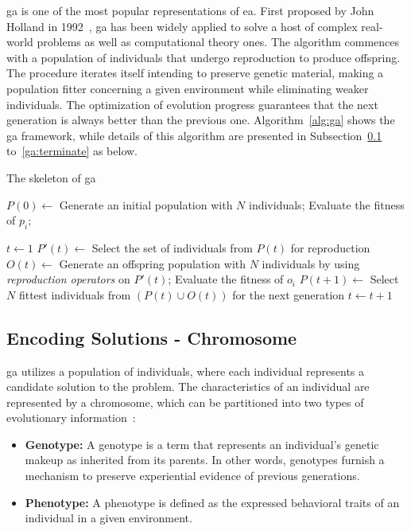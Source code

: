 \acrfull{ga} is one of the most popular representations of \gls{ea}. First proposed by John Holland in 1992~\cite{holland1992genetic}, \gls{ga} has been widely applied to solve a host of complex real-world problems as well as computational theory ones. The algorithm commences with a population of individuals that undergo reproduction to produce offspring. The procedure iterates itself intending to preserve genetic material, making a population fitter concerning a given environment while eliminating weaker individuals. The optimization of evolution progress guarantees that the next generation is always better than the previous one. Algorithm~\ref{alg:ga} shows the \gls{ga} framework, while details of this algorithm are presented in Subsection~\ref{ga:encoding} to~\ref{ga:terminate} as below.

\begin{algorithm}
	\caption{The skeleton of \gls{ga}}
	\label{alg:ga}
	\BlankLine
	\Begin
	{	
		$P(0) \leftarrow$ Generate an initial population with $N$ individuals; \;
		{
			Evaluate the fitness of $p_i$; \;
		} 
		
		$t \leftarrow 1$\;
		{
			$P'(t) \leftarrow$ Select the set of individuals from $P(t)$ for reproduction \;
			$O(t) \leftarrow$ Generate an offspring population with $N$ individuals by using \emph{reproduction operators} on $P'(t)$; \;
			{
				Evaluate the fitness of $o_i$\;
			} 
			$P(t+1) \leftarrow$ Select $N$ fittest individuals from $(P(t) \cup O(t))$ for the next generation\;
			$t \leftarrow t + 1$\;
		}
	}
\end{algorithm}

\subsection {Encoding Solutions - Chromosome}
\label{ga:encoding}
\gls{ga} utilizes a population of individuals, where each individual represents a candidate solution to the problem. The characteristics of an individual are represented by a chromosome, which can be partitioned into two types of evolutionary information~\cite{engelbrecht2007computational}: 
\begin{itemize}
	\item \textbf{Genotype:} A genotype is a term that represents an individual's genetic makeup as inherited from its parents. In other words, genotypes furnish a mechanism to preserve experiential evidence of previous generations.
	\item \textbf{Phenotype:} A phenotype is defined as the expressed behavioral traits of an individual in a given environment.
\end{itemize}

